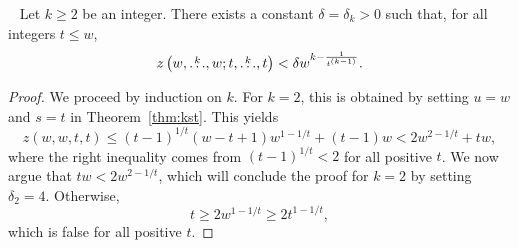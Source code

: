 \begin{lemma}~\label{lem:erdos64-quant}
    Let $k \geq 2$ be an integer.
    There exists a constant $\delta = \delta_k > 0$
    such that, for all integers $t \leq w$,
    \[
        z\left(w, \overset{k}{\dots}, w; t, \overset{k}{\dots}, t\right) < \delta w^{k - \frac{1}{t^{(k-1)}}}.
    \]
    \begin{proof}
        We proceed by induction on $k$.
        For $k=2$, this is obtained by setting $u = w$ and $s = t$ in Theorem~\ref{thm:kst}.
        This yields
        \[
            z(w, w, t, t)
            \leq (t-1)^{1/t}(w-t+1)w^{1-1/t} + (t-1)w
            < 2w^{2 - 1/t} + tw,
        \]
        where the right inequality comes from $(t-1)^{1/t} < 2$ for all positive $t$.
        We now argue that $tw < 2 w^{2-1/t}$,
        which will conclude the proof for $k=2$ by setting $\delta_2 = 4$.
        Otherwise,
        \[
            t \geq 2 w^{1 - 1/t} \geq 2 t^{1 - 1/t},
        \]
        which is false for all positive $t$.


\end{proof}
\end{lemma}
